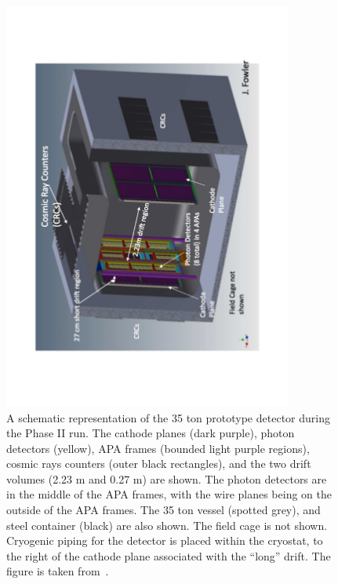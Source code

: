 \begin{figure}
  \centering
  \includegraphics[width=0.85\textwidth]{35tonSchem}
  \caption[A schematic representation of the 35 ton prototype detector during the Phase II run]
          {A schematic representation of the 35 ton prototype detector during the Phase II run. The cathode planes (dark purple), photon detectors (yellow), APA frames (bounded light purple regions), cosmic rays counters (outer black rectangles), and the two drift volumes (2.23 m and 0.27 m) are shown. The photon detectors are in the middle of the APA frames, with the wire planes being on the outside of the APA frames. The 35 ton vessel (spotted grey), and steel container (black) are also shown. The field cage is not shown. Cryogenic piping for the detector is placed within the cryostat, to the right of the cathode plane associated with the ``long'' drift. The figure is taken from~\citep{DUNECDR_V4}.}
  \label{fig:35tonSchem}
\end{figure}


